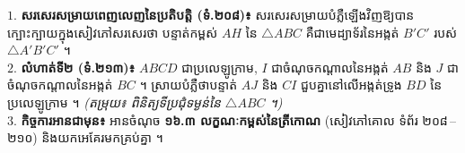 \documentclass[a4paper,10pt]{article}
\newcommand{\en}[1]{{\TimesEn #1}}
\newcommand{\tri}[1]{\ensuremath{\triangle #1}}
\begin{document}
\begin{tcolorbox}[
  enhanced, sharp corners, colback=panelgray, colframe=black,
  boxrule=0.85pt, boxsep=2.5pt, top=3.5pt, bottom=3.5pt, left=6pt, right=6pt
]
  $1.$ \textbf{សរសេរសម្រាយពេញលេញនៃប្រតិបត្តិ (ទំ.២០៨)៖} សរសេរសម្រាយបំភ្លឺឡើងវិញឱ្យបានក្បោះក្បាយក្នុងសៀវភៅសរសេរថា បន្ទាត់កម្ពស់ $AH$ នៃ $\tri{ABC}$ គឺជាមេដ្យាទ័រនៃអង្កត់ $B'C'$ របស់ $\tri{A'B'C'}$ ។\\[3pt]
  $2.$ \textbf{លំហាត់ទី២ (ទំ.២១៣)៖} $ABCD$ ជាប្រលេឡូក្រាម, $I$ ជាចំណុចកណ្ដាលនៃអង្កត់ $AB$ និង $J$ ជាចំណុចកណ្ដាលនៃអង្កត់ $BC$ ។ ស្រាយបំភ្លឺថាបន្ទាត់ $AJ$ និង $CI$ ជួបគ្នានៅលើអង្កត់ទ្រូង $BD$ នៃប្រលេឡូក្រាម ។ \textit{(តម្រុយ៖ ពិនិត្យទីប្រជុំទម្ងន់នៃ $\tri{ABC}$ ។)}\\[3pt]
  $3.$ \textbf{កិច្ចការអានជាមុន៖} អានចំណុច \textbf{១៦.៣ លក្ខណៈកម្ពស់នៃត្រីកោណ} (សៀវភៅគោល ទំព័រ ២០៨\,\en{--}\,២១០) និងយកអេគែរមកគ្រប់គ្នា ។
\end{tcolorbox}
\end{document}
